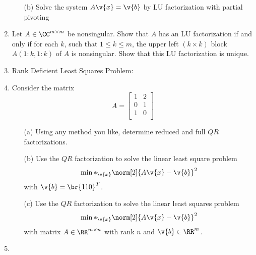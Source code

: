 \documentclass[11pt]{article}
\begin{document}
\begin{enumerate}
\begin{enumerate}
            \item[(b)]
                Solve the system $A\v{x} = \v{b}$ by LU factorization with
                partial pivoting
        \end{enumerate}

    \item %
        Let $A \in \CC^{m \times m}$ be nonsingular.
        Show that $A$ has an LU factorization if and only if for each $k$, such
        that $1 \le k \le m$, the upper left $(k \times k)$ block $A(1:k, 1:k)$
        of $A$ is nonsingular.
        Show that this LU factorization is unique.

    \item %
        Rank Deficient Least Squares Problem:

    \item %
        Consider the matrix
        \[
            A =
            \begin{bmatrix}
                1 & 2 \\
                0 & 1 \\
                1 & 0 \\
            \end{bmatrix}
        \]
        \begin{enumerate}
            \item[(a)]
                Using any method you like, determine reduced and full $QR$
                factorizations.

            \item[(b)]
                Use the $QR$ factorization to solve the linear least square problem
                \[
                    \min*_{\v{x}}\norm[2]{A\v{x} - \v{b}}^2
                \]
                with $\v{b} = \br{1 1 0}^T$.

            \item[(c)]
                Use the $QR$ factorization to solve the linear least squares
                problem
                \[
                    \min*_{\v{x}}\norm[2]{A\v{x} - \v{b}}^2
                \]
                with matrix $A \in \RR^{m \times n}$ with rank $n$ and
                $\v{b} \in \RR^m$.
        \end{enumerate}

    \item %


\end{enumerate}
\end{document}
